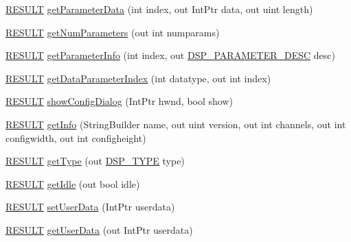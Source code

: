 \begin{DoxyCompactItemize}
\item 
\hyperlink{namespace_f_m_o_d_a305d1176ef3f8c8815861a60407ac33d}{R\+E\+S\+U\+LT} \hyperlink{class_f_m_o_d_1_1_d_s_p_a228cbd3a8b9104395c749730ca094226}{get\+Parameter\+Data} (int index, out Int\+Ptr data, out uint length)
\item 
\hyperlink{namespace_f_m_o_d_a305d1176ef3f8c8815861a60407ac33d}{R\+E\+S\+U\+LT} \hyperlink{class_f_m_o_d_1_1_d_s_p_ae1438b5d53f7c2c6e7ba023c8fd8b06f}{get\+Num\+Parameters} (out int numparams)
\item 
\hyperlink{namespace_f_m_o_d_a305d1176ef3f8c8815861a60407ac33d}{R\+E\+S\+U\+LT} \hyperlink{class_f_m_o_d_1_1_d_s_p_a86296128281b8872e1494647f2fa41f0}{get\+Parameter\+Info} (int index, out \hyperlink{struct_f_m_o_d_1_1_d_s_p___p_a_r_a_m_e_t_e_r___d_e_s_c}{D\+S\+P\+\_\+\+P\+A\+R\+A\+M\+E\+T\+E\+R\+\_\+\+D\+E\+SC} desc)
\item 
\hyperlink{namespace_f_m_o_d_a305d1176ef3f8c8815861a60407ac33d}{R\+E\+S\+U\+LT} \hyperlink{class_f_m_o_d_1_1_d_s_p_ab68360d5ad1f662b6af4b5d8e5caf80d}{get\+Data\+Parameter\+Index} (int datatype, out int index)
\item 
\hyperlink{namespace_f_m_o_d_a305d1176ef3f8c8815861a60407ac33d}{R\+E\+S\+U\+LT} \hyperlink{class_f_m_o_d_1_1_d_s_p_ab7dddd8b248f1b83464cc984094bffb0}{show\+Config\+Dialog} (Int\+Ptr hwnd, bool show)
\item 
\hyperlink{namespace_f_m_o_d_a305d1176ef3f8c8815861a60407ac33d}{R\+E\+S\+U\+LT} \hyperlink{class_f_m_o_d_1_1_d_s_p_abe605a15d4638f3df5b9f2cdeccc5717}{get\+Info} (String\+Builder name, out uint version, out int channels, out int configwidth, out int configheight)
\item 
\hyperlink{namespace_f_m_o_d_a305d1176ef3f8c8815861a60407ac33d}{R\+E\+S\+U\+LT} \hyperlink{class_f_m_o_d_1_1_d_s_p_a90873e967a2e0bec74828ed1da507cde}{get\+Type} (out \hyperlink{namespace_f_m_o_d_abfbbfe13740257430ae8350c2456b0ff}{D\+S\+P\+\_\+\+T\+Y\+PE} type)
\item 
\hyperlink{namespace_f_m_o_d_a305d1176ef3f8c8815861a60407ac33d}{R\+E\+S\+U\+LT} \hyperlink{class_f_m_o_d_1_1_d_s_p_a3f643f98646f1f15c1fc3cf446aa7c25}{get\+Idle} (out bool idle)
\item 
\hyperlink{namespace_f_m_o_d_a305d1176ef3f8c8815861a60407ac33d}{R\+E\+S\+U\+LT} \hyperlink{class_f_m_o_d_1_1_d_s_p_a9d1f48a083751c222998aeaaf1ea7c60}{set\+User\+Data} (Int\+Ptr userdata)
\item 
\hyperlink{namespace_f_m_o_d_a305d1176ef3f8c8815861a60407ac33d}{R\+E\+S\+U\+LT} \hyperlink{class_f_m_o_d_1_1_d_s_p_ade41e932d36f2075c359f9531215fad5}{get\+User\+Data} (out Int\+Ptr userdata)

\end{DoxyCompactItemize}
